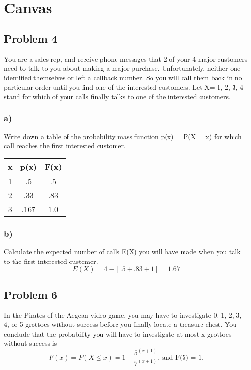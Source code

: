 \documentclass{article}
\begin{document}
\section*{Canvas}
\subsection*{Problem 4}
You are a sales rep, and receive phone messages that 2 of your 4 major customers need to talk  to  you  about  making  a  major  purchase.  Unfortunately,  neither  one  identified  themselves  or left a callback number. So you will call them back in no particular order until you find one of the interested customers. Let X= {1, 2, 3, 4} stand for which of your calls finally talks to one of the interested customers.
\subsubsection*{a)}
Write down a table of the probability mass function p(x) = P(X = x) for which call reaches the first interested customer.
\begin{center}
    \begin{tabular}{c|c|c}
        x & p(x) & F(x) \\
        \hline
        1 & .5 & .5\\
        2 & .33 & .83\\
        3 & .167 & 1.0\\
    \end{tabular}
\end{center}
\subsubsection*{b)}
Calculate the expected number of calls E(X) you will have made when you talk to the first interested customer.
\begin{equation}
    E(X) = 4 -[.5 + .83 + 1] = 1.67 
\end{equation}
\subsection*{Problem 6}
In the Pirates of the Aegean video game, you may have to investigate 0, 1, 2, 3, 4, or 5 grottoes without success before you finally locate a treasure chest. You conclude that the probability you will have to investigate at most x grottoes without success is 
\begin{equation}
    F(x) = P(X \leq x) =  1 - \frac{5^{(x+1)}}{7^{(x+1)}}\text{, and F(5) = 1.}
\end{equation}
\end{document}

